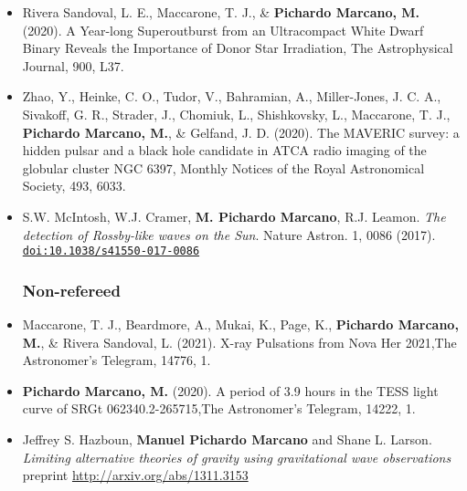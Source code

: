 \documentclass[letterpaper,10pt]{article}
\begin{document}
\begin{itemize}[label=$\blacktriangleright$]
        
        
    \item Rivera Sandoval, L. E., Maccarone, T. J., \& \textbf{Pichardo Marcano, M.} (2020). A Year-long Superoutburst from an Ultracompact White Dwarf Binary Reveals the Importance of Donor Star Irradiation, The Astrophysical Journal, 900, L37. \\

    \item Zhao, Y., Heinke, C. O., Tudor, V., Bahramian, A., Miller-Jones, J. C. A., Sivakoff, G. R., Strader, J., Chomiuk, L., Shishkovsky, L., Maccarone, T. J., \textbf{Pichardo Marcano, M.}, \& Gelfand, J. D. (2020). The MAVERIC survey: a hidden pulsar and a black hole candidate in ATCA radio imaging of the globular cluster NGC 6397, Monthly Notices of the Royal Astronomical Society, 493, 6033. \href{10.1093/mnras/staa631} \\


\item  S.W. McIntosh, W.J. Cramer, \textbf{M. Pichardo Marcano}, R.J. Leamon. \emph{The detection of Rossby-like waves on the Sun}. Nature Astron. 1, 0086 (2017). \href{http://dx.doi.org/10.1038/s41550-017-0086}{\tt doi:10.1038/s41550-017-0086} \\

\subsubsection*{Non-refereed}

\item Maccarone, T. J., Beardmore, A., Mukai, K., Page, K., \textbf{Pichardo Marcano, M.}, \& Rivera Sandoval, L. (2021). X-ray Pulsations from Nova Her 2021,The Astronomer's Telegram, 14776, 1.



\item \textbf{Pichardo Marcano, M.} (2020). A period of 3.9 hours in the TESS light curve of SRGt 062340.2-265715,The Astronomer's Telegram, 14222, 1.

\item  Jeffrey S. Hazboun, \textbf{Manuel Pichardo Marcano} and Shane L. Larson. \emph{Limiting alternative theories of gravity using gravitational wave observations} \\
 preprint \url{http://arxiv.org/abs/1311.3153} \\


\end{itemize}
\end{document}
